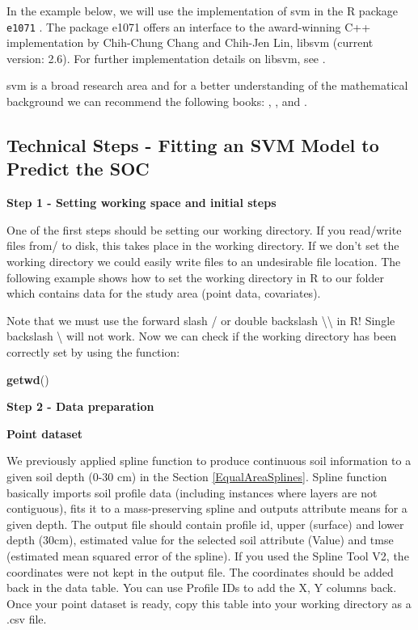 \documentclass[10pt,b5paper,]{book}
\newenvironment{Shaded}{\begin{snugshade}}{\end{snugshade}}
\newcommand{\KeywordTok}[1]{\textcolor[rgb]{0.13,0.29,0.53}{\textbf{#1}}}
\newcommand{\NormalTok}[1]{#1}
\theoremstyle{definition}
\theoremstyle{definition}
\theoremstyle{definition}
\theoremstyle{remark}
\begin{document}
In the example below, we will use the implementation of svm in the R
package \texttt{e1071} \citep{e1071}. The package e1071 offers an
interface to the award-winning C++ implementation by Chih-Chung Chang
and Chih-Jen Lin, libsvm (current version: 2.6). For further
implementation details on libsvm, see \citet{chang2001libsvm}.

svm is a broad research area and for a better understanding of the
mathematical background we can recommend the following books:
\citet{vapnik2013nature}, \citet{friedman2001elements}, and
\citet{james2013introduction}.

\hypertarget{technical-steps---fitting-an-svm-model-to-predict-the-soc}{%
\subsection{Technical Steps - Fitting an SVM Model to Predict the
SOC}\label{technical-steps---fitting-an-svm-model-to-predict-the-soc}}

\textbf{Step 1 - Setting working space and initial steps}

One of the first steps should be setting our working directory. If you
read/write files from/ to disk, this takes place in the working
directory. If we don't set the working directory we could easily write
files to an undesirable file location. The following example shows how
to set the working directory in R to our folder which contains data for
the study area (point data, covariates).

Note that we must use the forward slash / or double backslash
\textbackslash{}\textbackslash{} in R! Single backslash \textbackslash{}
will not work. Now we can check if the working directory has been
correctly set by using the function:

\begin{Shaded}
\begin{Highlighting}[]
\KeywordTok{getwd}\NormalTok{()}
\end{Highlighting}
\end{Shaded}

\textbf{Step 2 - Data preparation}

\textbf{Point dataset}

We previously applied spline function to produce continuous soil
information to a given soil depth (0-30 cm) in the Section
\ref{EqualAreaSplines}. Spline function basically imports soil profile
data (including instances where layers are not contiguous), fits it to a
mass-preserving spline and outputs attribute means for a given depth.
The output file should contain profile id, upper (surface) and lower
depth (30cm), estimated value for the selected soil attribute (Value)
and tmse (estimated mean squared error of the spline). If you used the
Spline Tool V2, the coordinates were not kept in the output file. The
coordinates should be added back in the data table. You can use Profile
IDs to add the X, Y columns back. Once your point dataset is ready, copy
this table into your working directory as a .csv file.
\end{document}

